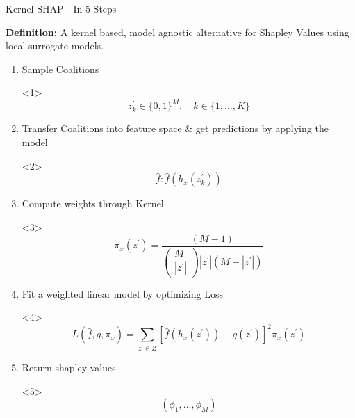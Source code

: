 \documentclass[11pt,compress,t,notes=noshow, aspectratio=169, xcolor=table]{beamer}
\begin{document}
\begin{vbframe}{Kernel SHAP - In 5 Steps}

\textbf{Definition:} A kernel based, model agnostic alternative for Shapley Values using local surrogate models.\\
\vspace{1cm}
\begin{enumerate}
    \item Sample Coalitions 
    \begin{onlyenv}<1>
    $$z_{k}^{\prime} \in\{0,1\}^{M}, \quad k \in\{1, \ldots, K\}$$
    \end{onlyenv}
    
    \item Transfer Coalitions into feature space \& get predictions by applying the model
    
    \begin{onlyenv}<2>
    $$\hat{f}: \hat{f}\left(h_{x}\left(z_{k}^{\prime}\right)\right)$$
    \end{onlyenv}
    
    \item Compute weights through Kernel
    \begin{onlyenv}<3>
    $$\pi_{x}\left(z^{\prime}\right)=\frac{(M-1)}{\left(\begin{array}{c} M \\\left|z^{\prime}\right|\end{array}\right)\left|z^{\prime}\right|\left(M-\left|z^{\prime}\right|\right)}$$
    \end{onlyenv}
    
    \item Fit a weighted linear model by optimizing Loss
    \begin{onlyenv}<4>
    $$L\left(\hat{f}, g, \pi_{x}\right)=\sum_{z^{\prime} \in Z}\left[\hat{f}\left(h_{x}\left(z^{\prime}\right)\right)-g\left(z^{\prime}\right)\right]^{2} \pi_{x}\left(z^{\prime}\right)$$
    \end{onlyenv}

    \item Return shapley values
    \begin{onlyenv}<5>
    $$(\phi_1, \ldots, \phi_M)$$
    \end{onlyenv}
    
    
\end{enumerate}

\end{vbframe}
\end{document}
